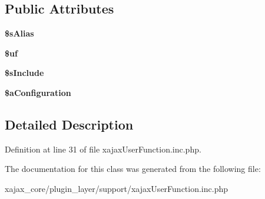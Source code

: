 \subsection*{Public Attributes}
\begin{DoxyCompactItemize}
\item 
\hypertarget{classxajaxUserFunction_a391b7613542509cc82b217f7d41d9cb6}{
{\bfseries \$sAlias}}
\label{classxajaxUserFunction_a391b7613542509cc82b217f7d41d9cb6}

\item 
\hypertarget{classxajaxUserFunction_a45da2fdfe612e0b67317d02e58d79d3f}{
{\bfseries \$uf}}
\label{classxajaxUserFunction_a45da2fdfe612e0b67317d02e58d79d3f}

\item 
\hypertarget{classxajaxUserFunction_a7cf04ef5817bcde3fba13a47db13e8fb}{
{\bfseries \$sInclude}}
\label{classxajaxUserFunction_a7cf04ef5817bcde3fba13a47db13e8fb}

\item 
\hypertarget{classxajaxUserFunction_aecea4f547e81ee300aba4e174d2f28a3}{
{\bfseries \$aConfiguration}}
\label{classxajaxUserFunction_aecea4f547e81ee300aba4e174d2f28a3}

\end{DoxyCompactItemize}


\subsection{Detailed Description}


Definition at line 31 of file xajaxUserFunction.inc.php.



The documentation for this class was generated from the following file:\begin{DoxyCompactItemize}
\item 
xajax\_\-core/plugin\_\-layer/support/xajaxUserFunction.inc.php\end{DoxyCompactItemize}
